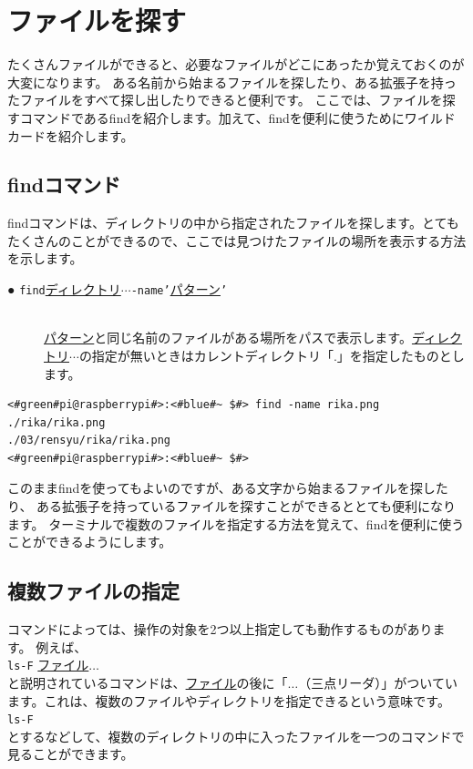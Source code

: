 \newpage
\section{ファイルを探す}
たくさんファイルができると、必要なファイルがどこにあったか覚えておくのが大変になります。
ある名前から始まるファイルを探したり、ある拡張子を持ったファイルをすべて探し出したりできると便利です。
ここでは、ファイルを探すコマンドであるfindを紹介します。加えて、findを便利に使うためにワイルドカードを紹介します。

\subsection{findコマンド}
findコマンドは、ディレクトリの中から指定されたファイルを探します。とてもたくさんのことができるので、ここでは見つけたファイルの場所を表示する方法を示します。

\begin{description}
    \item[● \texttt{find}\textvisiblespace \underline{ディレクトリ}$\cdots$\textvisiblespace \texttt{-name}\textvisiblespace \texttt{'}\underline{パターン}\texttt{'} ]\mbox{}\\ 
    \underline{パターン}と同じ名前のファイルがある場所をパスで表示します。\underline{ディレクトリ}$\cdots$の指定が無いときはカレントディレクトリ「.」を指定したものとします。
\end{description}

\begin{lstlisting}[caption=ワイルドカードの使い方, label=wildcard]
<#green#pi@raspberrypi#>:<#blue#~ $#> find -name rika.png
./rika/rika.png
./03/rensyu/rika/rika.png
<#green#pi@raspberrypi#>:<#blue#~ $#>
\end{lstlisting}

このままfindを使ってもよいのですが、ある文字から始まるファイルを探したり、
ある拡張子を持っているファイルを探すことができるととても便利になります。
ターミナルで複数のファイルを指定する方法を覚えて、findを便利に使うことができるようにします。

\subsection{複数ファイルの指定}
コマンドによっては、操作の対象を2つ以上指定しても動作するものがあります。
例えば、\\
\texttt{ls}\textvisiblespace \texttt{-F} \underline{ファイル}$\ldots$\\
と説明されているコマンドは、\underline{ファイル}の後に「$\ldots$（三点リーダ）」がついています。これは、複数のファイルやディレクトリを指定できるという意味です。\\
\texttt{ls}\textvisiblespace \texttt{-F} \\
とするなどして、複数のディレクトリの中に入ったファイルを一つのコマンドで見ることができます。


